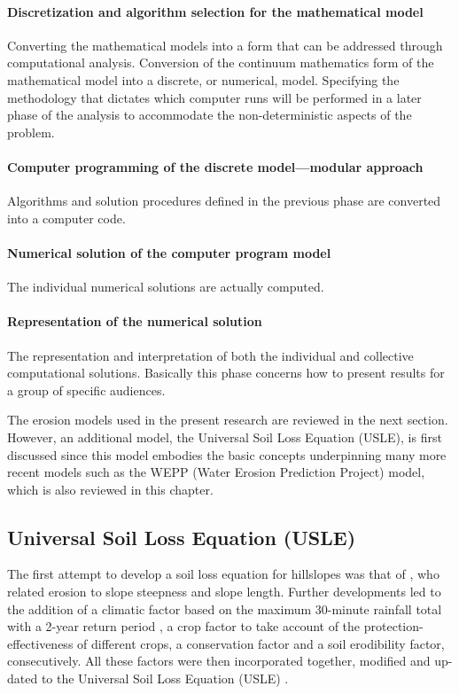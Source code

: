\paragraph{Discretization and algorithm selection for the mathematical
model}
Converting the mathematical models into a form that can be addressed through
computational analysis. Conversion of the continuum mathematics form of the
mathematical model into a discrete, or numerical, model. Specifying the
methodology that dictates which computer runs will be performed in a later phase
of the analysis to accommodate the non-deterministic aspects of the problem.

\paragraph{Computer programming of the discrete model---modular approach}
Algorithms and solution procedures defined in the previous phase are converted
into a computer code.

\paragraph{Numerical solution of the computer program model}
The individual numerical solutions are actually computed.

\paragraph{Representation of the numerical solution}
The representation and interpretation of both the individual and collective
computational solutions. Basically this phase concerns how to present results
for a group of specific audiences.

The erosion models used in the present research are reviewed in the next
section. However, an additional model, the Universal Soil Loss Equation (USLE),
is first discussed since this model embodies the basic concepts underpinning
many more recent models such as the WEPP (Water Erosion Prediction Project)
model, which is also reviewed in this chapter.

\subsection{Universal Soil Loss Equation (USLE)}
\label{sec:UniversalSoilLossEquationUSLE}

The first attempt to develop a soil loss equation for hillslopes was that of
\citet{zingg1940-59}, who related erosion to slope steepness and slope length.
Further developments led to the addition of a climatic factor based on the
maximum 30-minute rainfall total with a 2-year return period
\citep{musgrave1947-133}, a crop factor to take account of the
protection-effectiveness of different crops, a conservation factor and a soil
erodibility factor, consecutively. All these factors were then incorporated
together, modified and up-dated to the Universal Soil Loss Equation (USLE)
\citep{wischmeier1978-537}.

